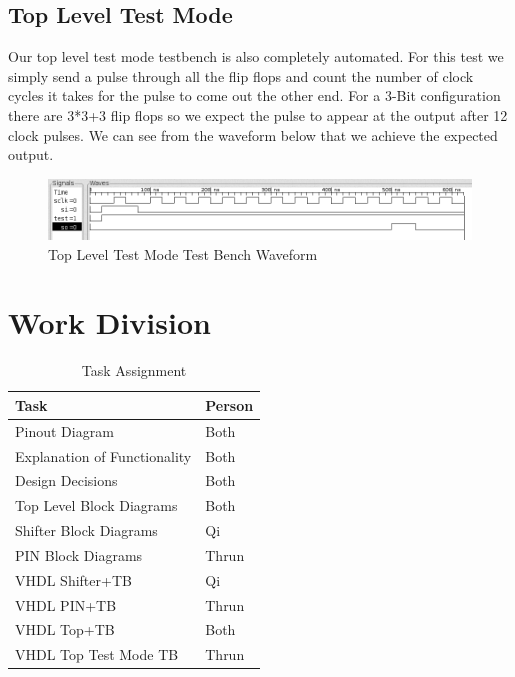 \documentclass{article}
\begin{document}
    \subsection{Top Level Test Mode}
        Our top level test mode testbench is also completely automated. For
        this test we simply send a pulse through all the flip flops and count
        the number of clock cycles it takes for the pulse to come out the other
        end. For a 3-Bit configuration there are 3*3+3 flip flops so we expect
        the pulse to appear at the output after 12 clock pulses. We can see
        from the waveform below that we achieve the expected output.
        \begin{figure}[H]
            \centering
            \includegraphics[width=\linewidth]{../../doc/vhdl_sim_pics/top_test.png}
            \caption{Top Level Test Mode Test Bench Waveform}
        \end{figure}

\section{Work Division}

\begin{table}[H]
    \centering
    \begin{tabular}{ll}
        \toprule
        \textbf{Task} & \textbf{Person}\\
        \midrule
        Pinout Diagram & Both \\
        Explanation of Functionality & Both \\
        Design Decisions & Both \\
        Top Level Block Diagrams & Both \\
        Shifter Block Diagrams & Qi \\
        PIN Block Diagrams & Thrun \\
        VHDL Shifter+TB & Qi \\
        VHDL PIN+TB & Thrun \\
        VHDL Top+TB & Both \\
        VHDL Top Test Mode TB & Thrun \\
        \bottomrule
    \end{tabular}
    \caption{Task Assignment}
\end{table}
\end{document}
